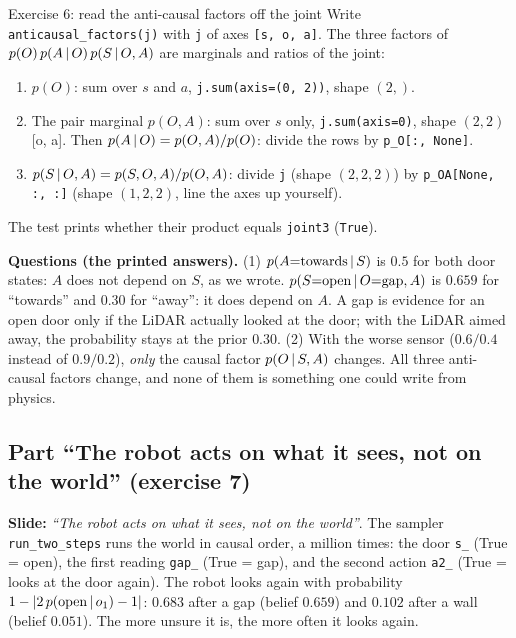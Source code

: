 \documentclass[11pt]{article}
\newcommand{\slide}[1]{\textit{``#1''}}
\begin{document}
\begin{labhelp}{Exercise 6: read the anti-causal factors off the joint}
Write \texttt{anticausal\_factors(j)} with \texttt{j} of axes \texttt{[s, o, a]}. The three factors of $p(O)\,p(A\,|\, O)\,p(S\,|\, O,A)$ are marginals and ratios of the joint:
\begin{enumerate}[nosep]
\item $p(O)$: sum over $s$ and $a$, \texttt{j.sum(axis=(0, 2))}, shape $(2,)$.
\item The pair marginal $p(O,A)$: sum over $s$ only, \texttt{j.sum(axis=0)}, shape $(2,2)$ [o, a]. Then $p(A\,|\, O)=p(O,A)/p(O)$: divide the rows by \texttt{p\_O[:, None]}.
\item $p(S\,|\, O,A)=p(S,O,A)/p(O,A)$: divide \texttt{j} (shape $(2,2,2)$) by \texttt{p\_OA[None, :, :]} (shape $(1,2,2)$, line the axes up yourself).
\end{enumerate}
The test prints whether their product equals \texttt{joint3} (\texttt{True}).

\textbf{Questions (the printed answers).}
(1) $p(A{=}\text{towards}\,|\, S)$ is $0.5$ for both door states: $A$ does not depend on $S$, as we wrote. $p(S{=}\text{open}\,|\, O{=}\text{gap},A)$ is $0.659$ for ``towards'' and $0.30$ for ``away'': it does depend on $A$. A gap is evidence for an open door only if the LiDAR actually looked at the door; with the LiDAR aimed away, the probability stays at the prior $0.30$.
(2) With the worse sensor ($0.6/0.4$ instead of $0.9/0.2$), \emph{only} the causal factor $p(O\,|\, S,A)$ changes. All three anti-causal factors change, and none of them is something one could write from physics.
\end{labhelp}

\subsection*{Part ``The robot acts on what it sees, not on the world'' (exercise 7)}
\textbf{Slide:} \slide{The robot acts on what it sees, not on the world}. The sampler \texttt{run\_two\_steps} runs the world in causal order, a million times: the door \texttt{s\_} (True = open), the first reading \texttt{gap\_} (True = gap), and the second action \texttt{a2\_} (True = looks at the door again). The robot looks again with probability $1-|2\,p(\text{open}\,|\, o_1)-1|$: $0.683$ after a gap (belief $0.659$) and $0.102$ after a wall (belief $0.051$). The more unsure it is, the more often it looks again.
\end{document}
